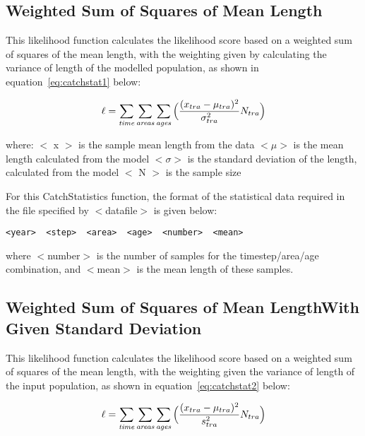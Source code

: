 \documentclass[10pt,twoside]{book}
\begin{document}
\subsection{Weighted Sum of Squares of Mean Length}
This likelihood function calculates the likelihood score based on a weighted sum of squares of the mean length, with the weighting given by calculating the variance of length of the modelled population, as shown in equation~\ref{eq:catchstat1} below:

\begin{equation}\label{eq:catchstat1}
\ell = \sum_{\it time}\sum_{\it areas}\sum_{\it ages} \Big(\frac{(x_{tra}-\mu_{tra})^2} {\sigma_{tra}^2} N_{tra}\Big)
\end{equation}

where:\newline
$<$ x $>$ is the sample mean length from the data\newline
$<\mu>$ is the mean length calculated from the model\newline
$<\sigma>$ is the standard deviation of the length, calculated from the model\newline
$<$ N $>$ is the sample size

\bigskip
For this CatchStatistics function, the format of the statistical data required in the file specified by $<$datafile$>$ is given below:

{\small\begin{verbatim}
<year>  <step>  <area>  <age>  <number>  <mean>
\end{verbatim}}

where $<$number$>$ is the number of samples for the timestep/area/age combination, and $<$mean$>$ is the mean length of these samples.

\subsection{Weighted Sum of Squares of Mean Length\newline With Given Standard Deviation}
This likelihood function calculates the likelihood score based on a weighted sum of squares of the mean length, with the weighting given the variance of length of the input population, as shown in  equation~\ref{eq:catchstat2} below:

\begin{equation}\label{eq:catchstat2}
\ell = \sum_{\it time}\sum_{\it areas}\sum_{\it ages} \Big(\frac{(x_{tra}-\mu_{tra})^2} {s_{tra}^2} N_{tra}\Big)
\end{equation}
\end{document}

